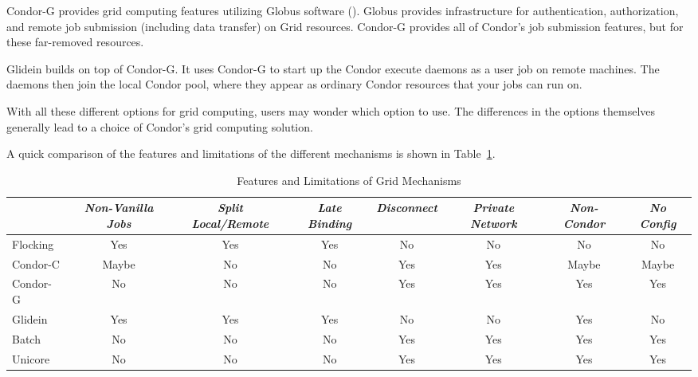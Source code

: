 Condor-G provides
grid computing features utilizing Globus software
().
Globus provides infrastructure for authentication, authorization,
and remote job submission (including data transfer) on Grid resources.
Condor-G provides all of Condor's job submission features,
but for these far-removed resources.

Glidein builds on top of Condor-G.
It uses Condor-G to start up the Condor
execute daemons as a user job on remote machines.
The daemons then join
the local Condor pool, where they appear as ordinary
Condor resources that your jobs can run on.


With all these different options for grid computing, 
users may 
wonder which option to use.
The differences in the options themselves generally lead
to a choice of Condor's grid computing solution.


A quick comparison of the features and limitations of the different
mechanisms is shown in Table~\ref{grid-features}.

\begin{center}
\begin{table}[hbt]
\begin{tabular}{|l||c|c|c|c|c|c|c|} \hline
 & \emph{Non-Vanilla Jobs} & \emph{Split Local/Remote} &
\emph{Late Binding} & \emph{Disconnect} & \emph{Private Network} &
\emph{Non-Condor} & \emph{No Config} \\ \hline \hline
Flocking & Yes & Yes & Yes & No & No & No & No \\ \hline
Condor-C & Maybe & No & No & Yes & Yes & Maybe & Maybe \\ \hline
Condor-G & No & No & No & Yes & Yes & Yes & Yes \\ \hline
Glidein & Yes & Yes & Yes & No & No & Yes & No \\ \hline
Batch & No & No & No & Yes & Yes & Yes & Yes \\ \hline
Unicore & No & No & No & Yes & Yes & Yes & Yes \\ \hline
\end{tabular}
\caption{\label{grid-features}Features and Limitations of Grid Mechanisms}
\end{table}
\end{center}

